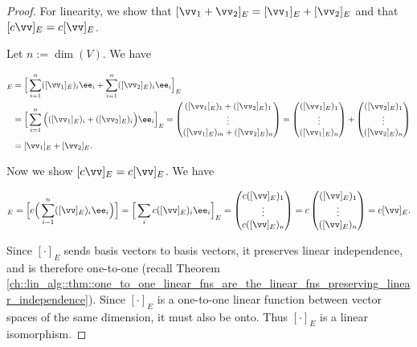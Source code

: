 \begin{proof}
    For linearity, we show that $[\vv_1 + \vv_2]_E = [\vv_1]_E + [\vv_2]_E$ and that $[c\vv]_E = c[\vv]_E$.
    
    Let $n := \dim(V)$. We have
        
    \begin{align*}
        [\vv_1 + \vv_2]_E
        &= \Big[\sum_{i = 1}^n ([\vv_1]_E)_i \ee_i + \sum_{i = 1}^n ([\vv_2]_E)_i \ee_i\Big]_E \\
        &= \Big[\sum_{i = 1}^n \Big(([\vv_1]_E)_i + ([\vv_2]_E)_i \Big) \ee_i \Big]_E
        = 
        \begin{pmatrix} ([\vv_1]_E)_1 + ([\vv_2]_E)_1 \\ \vdots \\ ([\vv_1]_E)_m + ([\vv_2]_E)_n \end{pmatrix}
        =
        \begin{pmatrix} ([\vv_1]_E)_1 \\ \vdots \\ ([\vv_1]_E)_n \end{pmatrix}
        +
        \begin{pmatrix} ([\vv_2]_E)_1 \\ \vdots \\ ([\vv_2]_E)_n \end{pmatrix} \\
        &= [\vv_1]_E + [\vv_2]_E.
    \end{align*}
        
    Now we show $[c \vv]_E = c [\vv]_E$. We have

     \begin{align*}
        [c\vv]_E = \Big[ c \Big( \sum_{i = 1 }^n ([\vv]_E)_i \ee_i \Big) \Big] = \Big[\sum_i c([\vv]_E)_i \ee_i\Big]_E = \begin{pmatrix} c([\vv]_E)_1 \\ \vdots \\ c([\vv]_E)_n \end{pmatrix}
        = c \begin{pmatrix} ([\vv]_E)_1 \\ \vdots \\ ([\vv]_E)_n \end{pmatrix}
        = c[\vv]_E.
    \end{align*}
    
    Since $[\cdot]_E$ sends basis vectors to basis vectors, it preserves linear independence, and is therefore one-to-one (recall Theorem \ref{ch::lin_alg::thm::one_to_one_linear_fns_are_the_linear_fns_preserving_linear_independence}). Since $[\cdot]_E$ is a one-to-one linear function between vector spaces of the same dimension, it must also be onto. Thus $[\cdot]_E$ is a linear isomorphism.

\end{proof}

